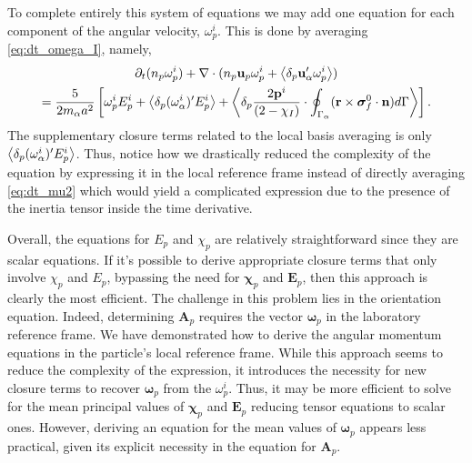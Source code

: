 To complete entirely this system of equations we may add one equation for each component of the angular velocity, $\omega_p^i$. 
This is done by averaging \ref{eq:dt_omega_I}, namely,
\begin{multline}
    \partial_t (n_p \omega^i_p)
    + \mathbf{\nabla}\cdot (
        n_p \textbf{u}_p \omega^i_p 
        + \left<\delta_p \textbf{u}_\alpha' \omega^i_p\right>
    )\\
    = 
    \frac{5}{2 m_\alpha a^2}\left[
        \omega^i_p E^i_p + \left<\delta_p (\omega^i_\alpha)' E^i_p\right>
        +\left<\delta_p 
        \frac{2 \textbf{p}^i}{ (2 - \chi_I)}\cdot 
        \oint_{\Gamma_{\alpha}} (\textbf{r}\times\bm\sigma_f^0\cdot \textbf{n}) d\Gamma 
        \right>
    \right]. 
\end{multline}
The supplementary closure terms related to the local basis averaging is only $\left<\delta_p (\omega^i_\alpha)' E^i_p\right>$.
Thus, notice how we drastically reduced the complexity of the equation by expressing it in the local reference frame instead of directly averaging \ref{eq:dt_mu2} which would yield a complicated expression due to the presence of the inertia tensor inside the time derivative.  

Overall, the equations for $E_p$ and $\chi_p$ are relatively straightforward since they are scalar equations. 
If it's possible to derive appropriate closure terms that only involve $\chi_p$ and $E_p$, bypassing the need for $\bm\chi_p$ and $\textbf{E}_p$, then this approach is clearly the most efficient. 
The challenge in this problem lies in the orientation equation.
Indeed, determining $\textbf{A}_p$ requires the vector $\bm\omega_p$ in the laboratory reference frame.
We have demonstrated how to derive the angular momentum equations in the particle's local reference frame. 
While this approach seems to reduce the complexity of the expression, it introduces the necessity for new closure terms to recover $\bm\omega_p$ from the $\omega^i_p$. 
Thus, it may be more efficient to solve for the mean principal values of $\bm\chi_p$ and $\textbf{E}_p$ reducing tensor equations to scalar ones.
However, deriving an equation for the mean values of $\bm\omega_p$ appears less practical, given its explicit necessity in the equation for $\textbf{A}_p$. 

